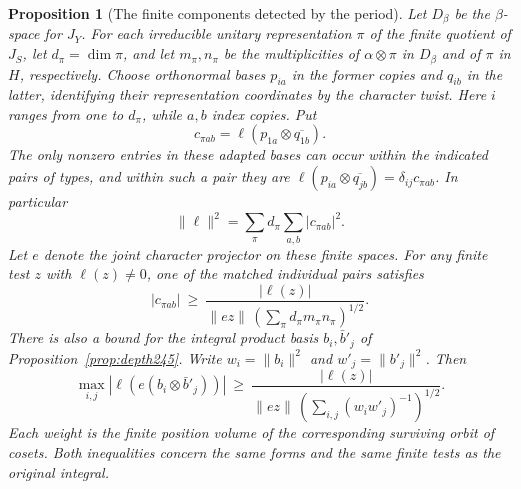 \documentclass[a4paper,11pt]{article}
\newtheorem{proposition}{Proposition}[section]
\theoremstyle{definition}
\theoremstyle{remark}
\numberwithin{equation}{section}
\begin{document}
\begin{proposition}[The finite components detected by the period]
\label{prop:characters245}
Let \(D_\beta\) be the \(\beta\)-space for \(J_Y\). For each
irreducible unitary representation \(\pi\) of the finite quotient of
\(J_S\), let \(d_\pi=\dim\pi\), and let \(m_\pi,n_\pi\) be the
multiplicities of \(\alpha\otimes\pi\) in \(D_\beta\) and of \(\pi\)
in \(H\), respectively. Choose orthonormal bases \(p_{ia}\) in the
former copies and \(q_{ib}\) in the latter, identifying their
representation coordinates by the character twist. Here \(i\) ranges
from one to \(d_\pi\), while \(a,b\) index copies. Put
\[
          c_{\pi ab}=\ell(p_{1a}\otimes\overline{q_{1b}}).
\]
The only nonzero entries in these adapted bases can occur within
the indicated pairs of types, and within such a pair they are
\(\ell(p_{ia}\otimes\overline{q_{jb}})=\delta_{ij}c_{\pi ab}\).
In particular
\[
 \|\ell\|^2=\sum_\pi d_\pi\sum_{a,b}|c_{\pi ab}|^2.
\]
Let \(e\) denote the joint character projector on these finite
spaces. For any finite test \(z\) with \(\ell(z)\ne0\), one of the
matched individual pairs satisfies
\[
    |c_{\pi ab}|\ \ge\
       \frac{|\ell(z)|}{\|ez\|\,(\sum_\pi d_\pi m_\pi n_\pi)^{1/2}} .
\]
There is also a bound for the integral product basis \(b_i,\bar b'_j\)
of Proposition~\ref{prop:depth245}. Write \(w_i=\|b_i\|^2\) and
\(w'_j=\|b'_j\|^2\). Then
\[
 \max_{i,j}|\ell(e(b_i\otimes\bar b'_j))|
 \ \ge\ \frac{|\ell(z)|}
      {\|ez\|\,(\sum_{i,j}(w_iw'_j)^{-1})^{1/2}} .
\]
Each weight is the finite position volume of the corresponding
surviving orbit of cosets. Both inequalities concern the same
forms and the same finite tests as the original integral.
\end{proposition}
\end{document}
